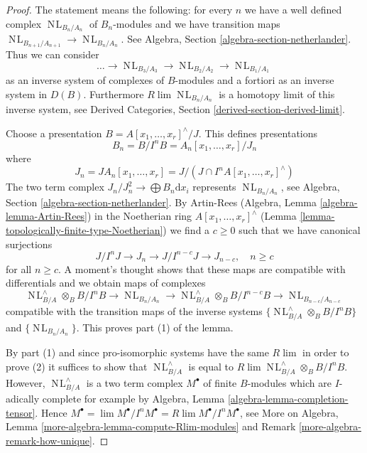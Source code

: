 \documentclass[10pt,a4paper]{amsart}
\theoremstyle{plain}
\theoremstyle{definition}
\theoremstyle{remark}
\numberwithin{equation}{subsection}
\def\lim{\mathop{\mathrm{lim}}\nolimits}
\def\NL{\mathop{N\!L}\nolimits}
\begin{document}
\begin{proof}
The statement means the following: for every $n$ we have a well
defined complex $\NL_{B_n/A_n}$ of $B_n$-modules and we have
transition maps $\NL_{B_{n + 1}/A_{n + 1}} \to \NL_{B_n/A_n}$.
See Algebra, Section \ref{algebra-section-netherlander}.
Thus we can consider
$$
\ldots \to \NL_{B_3/A_3} \to \NL_{B_2/A_2} \to \NL_{B_1/A_1}
$$
as an inverse system of complexes of $B$-modules and a fortiori as
an inverse system in $D(B)$. Furthermore $R\lim \NL_{B_n/A_n}$
is a homotopy limit of this inverse system, see
Derived Categories, Section \ref{derived-section-derived-limit}.

\medskip\noindent
Choose a presentation $B = A[x_1, \ldots, x_r]^\wedge / J$. This
defines presentations
$$
B_n = B/I^nB = A_n[x_1, \ldots, x_r]/J_n
$$
where
$$
J_n = JA_n[x_1, \ldots, x_r] =
J/(J \cap I^nA[x_1, \ldots, x_r]^\wedge)
$$
The two term complex $J_n/J_n^2 \longrightarrow \bigoplus B_n \text{d}x_i$
represents $\NL_{B_n/A_n}$, see
Algebra, Section \ref{algebra-section-netherlander}.
By Artin-Rees (Algebra, Lemma \ref{algebra-lemma-Artin-Rees})
in the Noetherian ring $A[x_1, \ldots, x_r]^\wedge$
(Lemma \ref{lemma-topologically-finite-type-Noetherian})
we find a $c \geq 0$ such that we have canonical surjections
$$
J/I^nJ \to J_n \to J/I^{n - c}J \to J_{n - c},\quad n \geq c
$$
for all $n \geq c$. A moment's thought shows that these maps are
compatible with differentials and we obtain maps of complexes
$$
\NL_{B/A}^\wedge \otimes_B B/I^nB \to
\NL_{B_n/A_n} \to
\NL_{B/A}^\wedge \otimes_B B/I^{n - c}B \to
\NL_{B_{n - c}/A_{n - c}}
$$
compatible with the transition maps of the inverse systems
$\{\NL_{B/A}^\wedge \otimes_B B/I^nB\}$ and $\{\NL_{B_n/A_n}\}$.
This proves part (1) of the lemma.

\medskip\noindent
By part (1) and since pro-isomorphic
systems have the same $R\lim$ in order to prove (2)
it suffices to show that $\NL_{B/A}^\wedge$ is
equal to $R\lim \NL_{B/A}^\wedge \otimes_B B/I^nB$.
However, $\NL_{B/A}^\wedge$ is a two term complex $M^\bullet$
of finite $B$-modules which are $I$-adically complete for example by
Algebra, Lemma \ref{algebra-lemma-completion-tensor}. Hence
$M^\bullet = \lim M^\bullet/I^nM^\bullet = R\lim M^\bullet/I^n M^\bullet$, see
More on Algebra, Lemma \ref{more-algebra-lemma-compute-Rlim-modules} and
Remark \ref{more-algebra-remark-how-unique}.
\end{proof}
\end{document}
